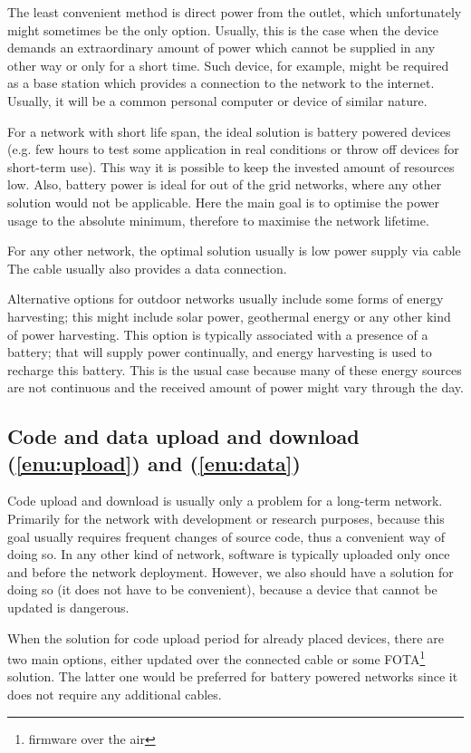 \documentclass[
  print, %
  Table,   %
  nolof,     %
  nolot,     %
           oneside
]{fithesis3}
\begin{document}
  The least convenient method is direct power from the outlet, which unfortunately might sometimes be the only option. Usually, this is the case when the device demands an extraordinary amount of power which cannot be supplied in any other way or only for a short time. Such device, for example, might be required as a base station which provides a connection to the network to the internet. Usually, it will be a common personal computer or device of similar nature.

  For a network with short life span, the ideal solution is battery powered devices (e.g. few hours to test some application in real conditions or throw off devices for short-term use). This way it is possible to keep the invested amount of resources low. Also, battery power is ideal for out of the grid networks, where any other solution would not be applicable. Here the main goal is to optimise the power usage to the absolute minimum, therefore to maximise the network lifetime.

  For any other network, the optimal solution usually is low power supply via cable The cable usually also provides a data connection.

  Alternative options for outdoor networks usually include some forms of energy harvesting; this might include solar power, geothermal energy or any other kind of power harvesting. This option is typically associated with a presence of a battery; that will supply power continually, and energy harvesting is used to recharge this battery. This is the usual case because many of these energy sources are not continuous and the received amount of power might vary through the day.

  \subsection{Code and data upload and download (\ref{enu:upload}) and (\ref{enu:data})}
  Code upload and download is usually only a problem for a long-term network. Primarily for the network with development or research purposes, because this goal usually requires frequent changes of source code, thus a convenient way of doing so. In any other kind of network, software is typically uploaded only once and before the network deployment. However, we also should have a solution for doing so (it does not have to be convenient), because a device that cannot be updated is dangerous.

  When the solution for code upload period for already placed devices, there are two main options, either updated over the connected cable or some FOTA\footnote{firmware over the air} solution. The latter one would be preferred for battery powered networks since it does not require any additional cables.
\end{document}
